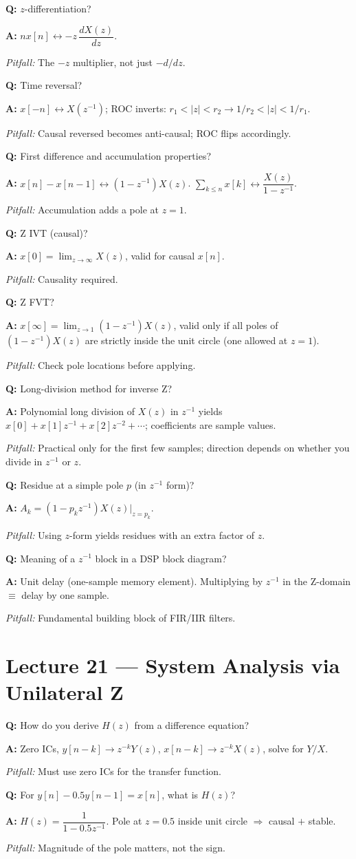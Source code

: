 \documentclass[11pt]{article}
\newcommand{\Q}[1]{\par\medskip\noindent\textbf{Q:} #1}
\newcommand{\A}[1]{\par\noindent\textbf{A:} #1}
\newcommand{\Pit}[1]{\par\noindent\textit{Pitfall:} #1}
\begin{document}
\Q{$z$-differentiation?}
\A{$nx[n]\leftrightarrow -z\,\dfrac{dX(z)}{dz}$.}
\Pit{The $-z$ multiplier, not just $-d/dz$.}

\Q{Time reversal?}
\A{$x[-n]\leftrightarrow X(z^{-1})$; ROC inverts: $r_1<|z|<r_2 \to 1/r_2<|z|<1/r_1$.}
\Pit{Causal reversed becomes anti-causal; ROC flips accordingly.}

\Q{First difference and accumulation properties?}
\A{$x[n]-x[n-1]\leftrightarrow (1-z^{-1})X(z)$. $\displaystyle\sum_{k\le n} x[k]\leftrightarrow \dfrac{X(z)}{1-z^{-1}}$.}
\Pit{Accumulation adds a pole at $z=1$.}

\Q{Z IVT (causal)?}
\A{$x[0] = \lim_{z\to\infty} X(z)$, valid for causal $x[n]$.}
\Pit{Causality required.}

\Q{Z FVT?}
\A{$x[\infty] = \lim_{z\to 1}(1-z^{-1})X(z)$, valid only if all poles of $(1-z^{-1})X(z)$ are strictly inside the unit circle (one allowed at $z=1$).}
\Pit{Check pole locations before applying.}

\Q{Long-division method for inverse Z?}
\A{Polynomial long division of $X(z)$ in $z^{-1}$ yields $x[0]+x[1]z^{-1}+x[2]z^{-2}+\cdots$; coefficients are sample values.}
\Pit{Practical only for the first few samples; direction depends on whether you divide in $z^{-1}$ or $z$.}

\Q{Residue at a simple pole $p$ (in $z^{-1}$ form)?}
\A{$A_k = (1-p_k z^{-1})X(z)\big|_{z=p_k}$.}
\Pit{Using $z$-form yields residues with an extra factor of $z$.}

\Q{Meaning of a $z^{-1}$ block in a DSP block diagram?}
\A{Unit delay (one-sample memory element). Multiplying by $z^{-1}$ in the Z-domain $\equiv$ delay by one sample.}
\Pit{Fundamental building block of FIR/IIR filters.}

\section{Lecture 21 --- System Analysis via Unilateral Z}

\Q{How do you derive $H(z)$ from a difference equation?}
\A{Zero ICs, $y[n-k]\to z^{-k}Y(z)$, $x[n-k]\to z^{-k}X(z)$, solve for $Y/X$.}
\Pit{Must use zero ICs for the transfer function.}

\Q{For $y[n]-0.5y[n-1]=x[n]$, what is $H(z)$?}
\A{$H(z) = \dfrac{1}{1-0.5z^{-1}}$. Pole at $z=0.5$ inside unit circle $\Rightarrow$ causal $+$ stable.}
\Pit{Magnitude of the pole matters, not the sign.}
\end{document}
